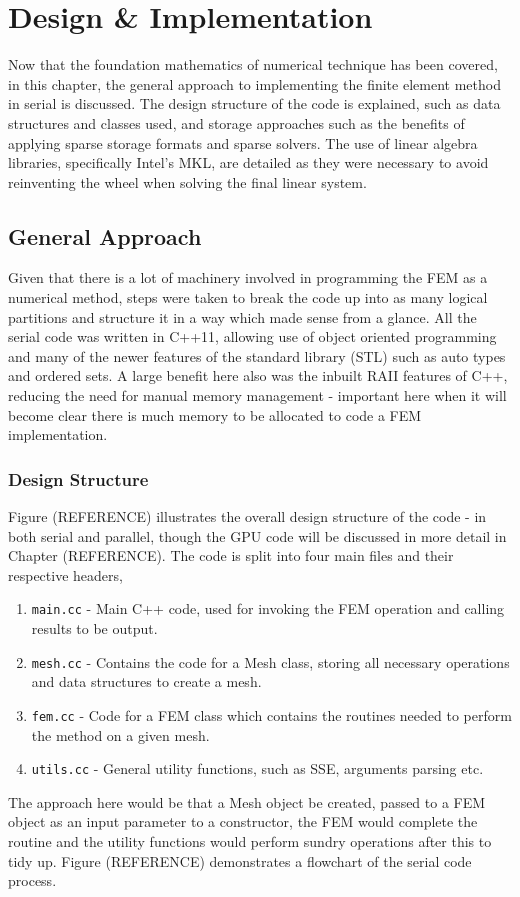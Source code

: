 \clearpage
\chapter{Design \& Implementation}

Now that the foundation mathematics of numerical technique has been covered, in this chapter, the general approach to implementing the finite element method in serial is discussed. The design structure of the code is explained, such as data structures and classes used, and storage approaches such as the benefits of applying sparse storage formats and sparse solvers. The use of linear algebra libraries, specifically Intel's MKL, are detailed as they were necessary to avoid reinventing the wheel when solving the final linear system. 
 
\section{General Approach}

Given that there is a lot of machinery involved in programming the FEM as a numerical method, steps were taken to break the code up into as many logical partitions and structure it in a way which made sense from a glance. All the serial code was written in C++11, allowing use of object oriented programming and many of the newer features of the standard library (STL) such as auto types and ordered sets. A large benefit here also was the inbuilt RAII features of C++, reducing the need for manual memory management - important here when it will become clear there is much memory to be allocated to code a FEM implementation.

\subsection{Design Structure}

Figure (REFERENCE) illustrates the overall design structure of the code - in both serial and parallel, though the GPU code will be discussed in more detail in Chapter (REFERENCE). The code is split into four main files and their respective headers,
\begin{enumerate}
	\item \texttt{main.cc} - Main C++ code, used for invoking the FEM operation and calling results to be output.
	\item \texttt{mesh.cc} - Contains the code for a Mesh class, storing all necessary operations and data structures to create a mesh.
	\item \texttt{fem.cc} - Code for a FEM class which contains the routines needed to perform the method on a given mesh.
	\item \texttt{utils.cc} - General utility functions, such as SSE, arguments parsing etc.
\end{enumerate}
The approach here would be that a Mesh object be created, passed to a FEM object as an input parameter to a constructor, the FEM would complete the routine and the utility functions would perform sundry operations after this to tidy up. Figure (REFERENCE) demonstrates a flowchart of the serial code process.

